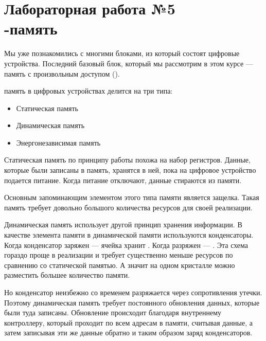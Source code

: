 \chapter{Лабораторная работа №5\\-память} 

\par{Мы уже познакомились с многими блоками, из который состоят цифровые устройства. Последний базовый  блок, который мы рассмотрим в этом курсе — память с произвольным доступом ().}

\vspace{4mm}

\par{ память в цифровых устройствах делится на три типа:}
  \begin{itemize}[noitemsep,topsep=0pt, after=\vspace{2pt}]
    \item Статическая память
    \item Динамическая память
    \item Энергонезависимая память
  \end{itemize}

\par{Статическая память по принципу работы похожа на набор регистров. Данные, которые были записаны в память, хранятся в ней, пока на цифровое устройство подается питание. Когда питание отключают, данные стираются из памяти.}

\par{Основным запоминающим элементом этого типа памяти является защелка. Такая память требует довольно большого количества ресурсов для своей реализации.}

\vspace{4mm}

\par{Динамическая память использует другой принцип хранения информации. В качестве элемента памяти в динамической памяти используются конденсаторы. Когда конденсатор заряжен — ячейка хранит . Когда разряжен — . Эта схема гораздо проще в реализации и требует существенно меньше ресурсов по сравнению со статической памятью. А значит на одном кристалле можно разместить большее количество памяти.}

\par{Но конденсатор неизбежно со временем разряжается через сопротивления утечки. Поэтому динамическая память требует постоянного обновления данных, которые были туда записаны. Обновление происходит благодаря внутреннему контроллеру, который проходит по всем адресам в памяти, считывая данные, а затем записывая эти же данные обратно и таким образом  заряд конденсаторов.}

